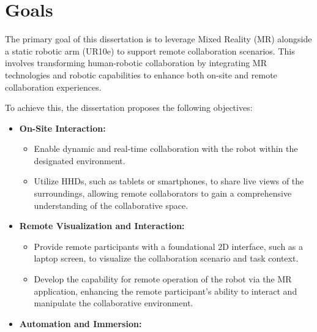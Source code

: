 \section{Goals}
\label{section:Goals}
% 
The primary goal of this dissertation is to leverage Mixed Reality (\ac{MR}) alongside a static robotic arm (UR10e) to support remote collaboration scenarios. 
This involves transforming human-robotic collaboration by integrating \ac{MR} technologies and robotic capabilities to enhance both on-site and 
remote collaboration experiences.

To achieve this, the dissertation proposes the following objectives:

\begin{itemize}
    \item \textbf{On-Site Interaction:}
    \begin{itemize}
        \item Enable dynamic and real-time collaboration with the robot within the designated environment.
        \item Utilize \ac{HHDs}, such as tablets or smartphones, to share live views of the surroundings, allowing remote collaborators 
        to gain a comprehensive understanding of the collaborative space.
    \end{itemize}
    \item \textbf{Remote Visualization and Interaction:}
    \begin{itemize}
        \item Provide remote participants with a foundational 2D interface, such as a laptop screen, to visualize the collaboration scenario and 
        task context.
        \item Develop the capability for remote operation of the robot via the \ac{MR} application, enhancing the remote participant's ability to 
        interact and manipulate the collaborative environment.
    \end{itemize}
    \item \textbf{Automation and Immersion:}
    \begin{itemize}

\end{itemize}
\end{itemize}
